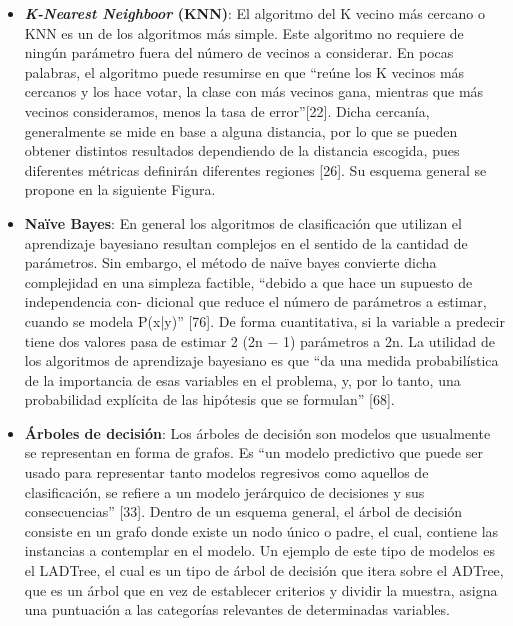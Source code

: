 \begin{itemize}
\item \textbf{\textit{K-Nearest Neighboor} (KNN)}: El algoritmo del K vecino más cercano o KNN es un de los algoritmos más simple. Este algoritmo no requiere de ningún parámetro fuera del número de vecinos a considerar. En pocas palabras, el algoritmo puede resumirse en que ``reúne los K vecinos más cercanos y los hace votar, la clase con más vecinos gana, mientras que más vecinos consideramos, menos la tasa de error''[22]. Dicha cercanía, generalmente se mide en base a alguna distancia, por lo que se pueden obtener distintos resultados dependiendo de la distancia escogida, pues diferentes métricas definirán diferentes regiones [26]. Su esquema general se propone en la siguiente Figura.



\item \textbf{Na\"ive Bayes}: En general los algoritmos de clasificación que utilizan el aprendizaje bayesiano resultan complejos en el sentido de la cantidad de parámetros. Sin embargo, el método de na\"ive bayes convierte dicha complejidad en una simpleza factible, “debido a que hace un supuesto de independencia con-
dicional que reduce el número de parámetros a estimar, cuando se modela P(x|y)” [76]. De forma cuantitativa, si la variable a predecir tiene dos valores pasa de estimar 2 (2n − 1) parámetros a 2n. La utilidad de los algoritmos de aprendizaje bayesiano es que “da una medida probabilística de la importancia de esas variables en el problema, y, por lo tanto, una probabilidad explícita de las hipótesis que se formulan” [68].

\item \textbf{Árboles de decisión}: Los árboles de decisión son modelos que usualmente se representan en forma de grafos. Es ``un modelo predictivo que puede ser usado para representar tanto modelos regresivos como aquellos de clasificación, se refiere a un modelo jerárquico de decisiones y sus consecuencias'' [33]. Dentro de un esquema general, el árbol de decisión consiste en un grafo donde existe un nodo único o padre, el cual, contiene las instancias a contemplar en el modelo. Un ejemplo de este tipo de modelos es el LADTree, el cual es un tipo de árbol de decisión que itera sobre el ADTree, que es un árbol que en vez de establecer criterios y dividir la muestra, asigna una puntuación a las categorías relevantes de determinadas variables.




\end{itemize}
